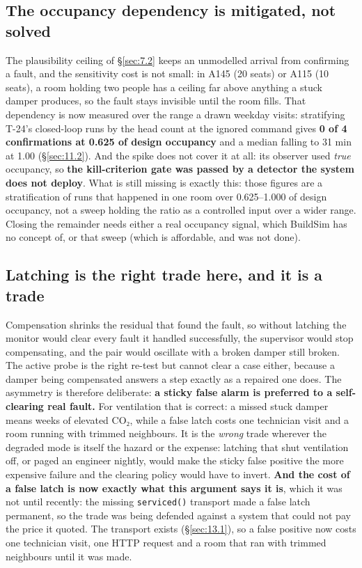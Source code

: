 \subsection{The occupancy dependency is mitigated, not solved}\label{sec:13.7}

The plausibility ceiling of §\ref{sec:7.2} keeps an unmodelled arrival from confirming a fault, and the
sensitivity cost is not small: in A145 (20 seats) or A115 (10 seats), a room holding two people has a
ceiling far above anything a stuck damper produces, so the fault stays invisible until the room fills.
That dependency is now measured over the range a drawn weekday visits: stratifying T-24's
closed-loop runs by the head count at the ignored command gives \textbf{0 of 4 confirmations at 0.625
of design occupancy} and a median falling to 31 min at 1.00 (§\ref{sec:11.2}). And the spike does not cover
it at all: its observer used \emph{true} occupancy, so \textbf{the kill-criterion gate was passed by
a detector the system does not deploy}. What is still missing is exactly this: those figures are a
stratification of runs that happened in one room over 0.625–1.000 of design occupancy, not a sweep
holding the ratio as a controlled input over a wider range. Closing the remainder needs either a real
occupancy signal, which BuildSim has no concept of, or that sweep (which is affordable, and was not
done).

\subsection{Latching is the right trade here, and it is a trade}\label{sec:13.8}

Compensation shrinks the residual that found the fault, so without latching the monitor would clear
every fault it handled successfully, the supervisor would stop compensating, and the pair would
oscillate with a broken damper still broken. The active probe is the right re-test but cannot clear a
case either, because a damper being compensated answers a step exactly as a repaired one does. The
asymmetry is therefore deliberate: \textbf{a sticky false alarm is preferred to a self-clearing real
fault.} For ventilation that is correct: a missed stuck damper means weeks of elevated CO₂, while a
false latch costs one technician visit and a room running with trimmed neighbours. It is the
\emph{wrong} trade wherever the degraded mode is itself the hazard or the expense: latching that shut
ventilation off, or paged an engineer nightly, would make the sticky false positive the more expensive
failure and the clearing policy would have to invert. \textbf{And the cost of a false latch is now
exactly what this argument says it is}, which it was not until recently: the missing
\texttt{serviced()} transport made a false latch permanent, so the trade was being defended against a
system that could not pay the price it quoted. The transport exists (§\ref{sec:13.1}), so a false positive now
costs one technician visit, one HTTP request and a room that ran with trimmed neighbours until it was
made.

